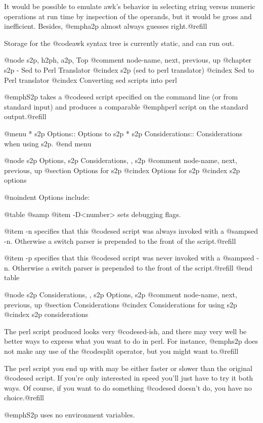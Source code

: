{{{{{{{{{{{{{{{It would be possible to emulate awk's behavior in selecting string
versus numeric operations at run time by inspection of the operands, but
it would be gross and inefficient.  Besides, @emph{a2p} almost always
guesses right.@refill

Storage for the @code{awk} syntax tree is currently static, and can run
out.

@node     s2p, h2ph, a2p, Top
@comment  node-name,  next,  previous,  up
@chapter s2p - Sed to Perl Translator
@cindex s2p (sed to perl translator)
@cindex Sed to Perl translator
@cindex Converting sed scripts into perl

@emph{S2p} takes a @code{sed} script specified on the command line (or
from standard input) and produces a comparable @emph{perl} script on the
standard output.@refill

@menu
* s2p Options::         Options to s2p
* s2p Considerations::  Considerations when using s2p.
@end menu

@node     s2p Options, s2p Considerations, , s2p
@comment  node-name,  next,  previous,  up
@section Options for s2p
@cindex Options for s2p
@cindex s2p options

@noindent
Options include:

@table @samp
@item -D<number>
sets debugging flags.

@item -n
specifies that this @code{sed} script was always invoked with a
@samp{sed -n}.  Otherwise a switch parser is prepended to the front of
the script.@refill

@item -p
specifies that this @code{sed} script was never invoked with a @samp{sed -n}.
Otherwise a switch parser is prepended to the front of the script.@refill
@end table

@node     s2p Considerations, , s2p Options, s2p
@comment  node-name,  next,  previous,  up
@section Considerations
@cindex Considerations for using s2p
@cindex s2p considerations

The perl script produced looks very @code{sed}-ish, and there may very
well be better ways to express what you want to do in perl.  For
instance, @emph{s2p} does not make any use of the @code{split} operator,
but you might want to.@refill

The perl script you end up with may be either faster or slower than the
original @code{sed} script.  If you're only interested in speed you'll
just have to try it both ways.  Of course, if you want to do something
@code{sed} doesn't do, you have no choice.@refill

@emph{S2p} uses no environment variables.

}}}}}}}}}}}}}}}
